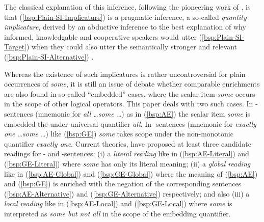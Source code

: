 \documentclass[fleqn,reqno,10pt]{article}
\newcommand{\as}{\acro{as}}
\renewcommand{\es}{\acro{es}}
\begin{document}
\noindent The classical explanation of this inference, following the
pioneering work of \citet{Grice1975:Logic-and-Conve}, is that
(\ref{bsp:Plain-SI-Implicature}) is a pragmatic inference, a so-called
\emph{quantity implicature}, derived by an abductive inference to the
best explanation of why informed, knowledgable and cooperative
speakers would utter (\ref{bsp:Plain-SI-Target}) when they could also
utter the semantically stronger and relevant
(\ref{bsp:Plain-SI-Alternative}) \citep[see][for a recent
overview]{Geurts2010:Quantity-Implic}.



Whereas the existence of such implicatures is rather uncontroversial
for plain occurrences of \emph{some}, it is still an issue of debate
whether comparable enrichments are also found in so-called
``embedded'' cases, where the scalar item \emph{some} occurs in the
scope of other logical operators. This paper deals with two such
cases.  In \as-sentences (mnemonic for \textit{all \dots some \dots})
as in (\ref{bsp:AE}) the scalar item \emph{some} is embedded the under
universal quantifier \emph{all}. In \es-sentences (mnemonic for
\textit{exactly one \dots some \dots}) like (\ref{bsp:GE}) \emph{some}
takes scope under the non-monotonic quantifier \emph{exactly one}.
Current theories, have proposed at least three candidate readings
for \as- and \es-sentences: (i) a \emph{literal reading} like in (\ref{bsp:AE-Literal}) and
(\ref{bsp:GE-Literal}) where \emph{some} has only its literal meaning;
(ii) a \emph{global reading} like in (\ref{bsp:AE-Global}) and
(\ref{bsp:GE-Global}) where the meaning of (\ref{bsp:AE}) and
(\ref{bsp:GE}) is enriched with the negation of the corresponding
sentences (\ref{bsp:AE-Alternative}) and (\ref{bsp:GE-Alternative})
respectively; and also (iii) a \emph{local reading} like in
(\ref{bsp:AE-Local}) and (\ref{bsp:GE-Local}) where \emph{some} is
interpreted as \emph{some but not all} in the scope of the embedding
quantifier.
\end{document}
